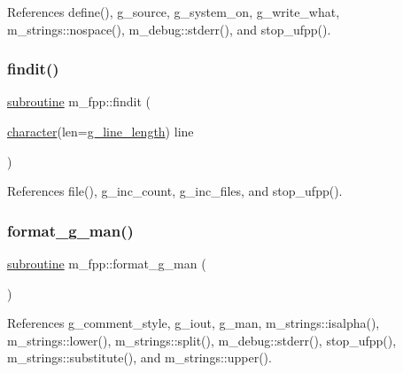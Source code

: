References define(), g\+\_\+source, g\+\_\+system\+\_\+on, g\+\_\+write\+\_\+what, m\+\_\+strings\+::nospace(), m\+\_\+debug\+::stderr(), and stop\+\_\+ufpp().

\mbox{\label{namespacem__fpp_a53852a7bdeabe727148d17df3448caae}} 
\subsubsection{\texorpdfstring{findit()}{findit()}}
{\footnotesize\ttfamily \hyperlink{M__stopwatch_83_8txt_acfbcff50169d691ff02d4a123ed70482}{subroutine} m\+\_\+fpp\+::findit (\begin{DoxyParamCaption}\item[{\hyperlink{option__stopwatch_83_8txt_abd4b21fbbd175834027b5224bfe97e66}{character}(len=\hyperlink{namespacem__fpp_ab93f8756cf248cf8db932573009d4664}{g\+\_\+line\+\_\+length})}]{line }\end{DoxyParamCaption})}



References file(), g\+\_\+inc\+\_\+count, g\+\_\+inc\+\_\+files, and stop\+\_\+ufpp().

\mbox{\label{namespacem__fpp_ae366d933366dea7f28b44653b5ef04d6}} 
\subsubsection{\texorpdfstring{format\+\_\+g\+\_\+man()}{format\_g\_man()}}
{\footnotesize\ttfamily \hyperlink{M__stopwatch_83_8txt_acfbcff50169d691ff02d4a123ed70482}{subroutine} m\+\_\+fpp\+::format\+\_\+g\+\_\+man (\begin{DoxyParamCaption}{ }\end{DoxyParamCaption})}



References g\+\_\+comment\+\_\+style, g\+\_\+iout, g\+\_\+man, m\+\_\+strings\+::isalpha(), m\+\_\+strings\+::lower(), m\+\_\+strings\+::split(), m\+\_\+debug\+::stderr(), stop\+\_\+ufpp(), m\+\_\+strings\+::substitute(), and m\+\_\+strings\+::upper().

\mbox{\label{namespacem__fpp_a3293bb9a959675261bda2b8f6fe3fa9e}} 

